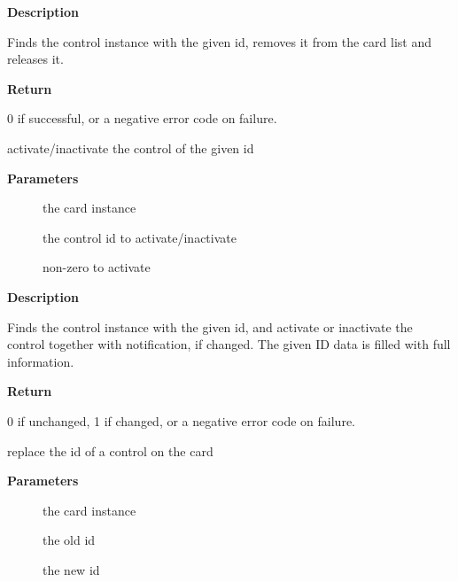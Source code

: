 \documentclass[a4paper,8pt,english]{sphinxmanual}
\begin{document}
\textbf{Description}

Finds the control instance with the given id, removes it from the
card list and releases it.

\textbf{Return}

0 if successful, or a negative error code on failure.

\begin{fulllineitems}
\label{sound/kernel-api/alsa-driver-api:c.snd_ctl_activate_id}
activate/inactivate the control of the given id

\end{fulllineitems}


\textbf{Parameters}
\begin{description}
\item[{}] \leavevmode
the card instance

\item[{}] \leavevmode
the control id to activate/inactivate

\item[{}] \leavevmode
non-zero to activate

\end{description}

\textbf{Description}

Finds the control instance with the given id, and activate or
inactivate the control together with notification, if changed.
The given ID data is filled with full information.

\textbf{Return}

0 if unchanged, 1 if changed, or a negative error code on failure.

\begin{fulllineitems}
\label{sound/kernel-api/alsa-driver-api:c.snd_ctl_rename_id}
replace the id of a control on the card

\end{fulllineitems}


\textbf{Parameters}
\begin{description}
\item[{}] \leavevmode
the card instance

\item[{}] \leavevmode
the old id

\item[{}] \leavevmode
the new id

\end{description}
\end{document}
